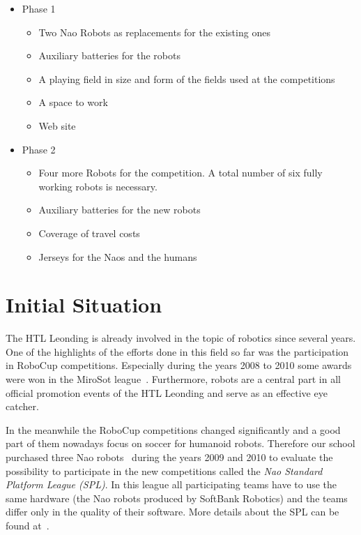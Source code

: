 \documentclass[12pt]{article}
\theoremstyle{definition}
\begin{document}
\begin{itemize}
	\item Phase 1
    	\begin{itemize}
            	\item Two Nao Robots as replacements for the existing ones
		\item Auxiliary batteries for the robots
            	\item A playing field in size and form of the fields used at the competitions
		\item A space to work
            	\item Web site
    	\end{itemize}
	\item Phase 2
	\begin{itemize}
            	\item Four more Robots for the competition. A total number of six fully working robots is necessary.
            	\item Auxiliary batteries for the new robots
            	\item Coverage of travel costs
		\item Jerseys for the Naos and the humans
	\end{itemize}
\end{itemize}

\section{Initial Situation}
The HTL Leonding is already involved in the topic of robotics since several years. One of the highlights of the efforts done in this field so far was the participation in RoboCup competitions. Especially during the years 2008 to 2010 some awards were won in the MiroSot league~\cite{fira_micro_2014}. Furthermore, robots are a central part in all official promotion events of the HTL Leonding and serve as an effective eye catcher.

In the meanwhile the RoboCup competitions changed significantly and a good part of them nowadays focus on soccer for humanoid robots. Therefore our school purchased three Nao robots~\cite{softbank_robotics_who_2016} during the years 2009 and 2010 to evaluate the possibility to participate in the new competitions called the {\em Nao Standard Platform League (SPL)}. In this league all participating teams have to use the same hardware (the Nao robots produced by SoftBank Robotics) and the teams differ only in the quality of their software. More details about the SPL can be found at~\cite{spl_standard_2016}.
\end{document}
